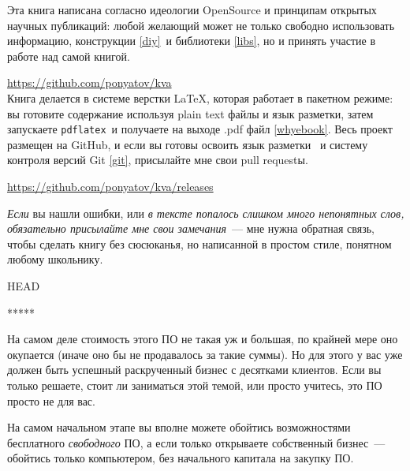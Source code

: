 

\bigskip

\noindent
Эта книга написана согласно идеологии OpenSource и принципам открытых научных
публикаций: любой желающий может не только свободно использовать информацию,
конструкции \ref{diy}\ и библиотеки \ref{libs}, но и принять участие в работе
над самой книгой. \licence


\bigskip
\url{https://github.com/ponyatov/kva}\\

\clearpage 
Книга делается в системе верстки \LaTeX{}, которая работает в пакетном
режиме:
вы готовите содержание используя plain text файлы и язык разметки, затем
запускаете \verb|pdflatex|\ и получаете на выходе .pdf файл \ref{whyebook}. Весь
проект размещен на GitHub, и если вы готовы освоить язык разметки
\cite{lvovsky}\ и систему контроля версий Git \ref{git}, присылайте мне свои
pull requestы.

\medskip 
\url{https://github.com/ponyatov/kva/releases}

\bigskip
\emph{Если} вы нашли ошибки, или \emph{в тексте попалось слишком много
непонятных слов, обязательно присылайте мне свои замечания}\ --- мне нужна
обратная связь, чтобы сделать книгу без сюсюканья, но написанной в простом
стиле, понятном любому школьнику.

HEAD


\clearpage

\label{whynd}
*****
\clearpage

На самом деле стоимость этого ПО не такая уж и большая, по крайней мере оно
окупается (иначе оно бы не продавалось за такие суммы). Но для этого у вас уже
должен быть успешный раскрученный бизнес с десятками клиентов. Если вы только
решаете, стоит ли заниматься этой темой, или просто учитесь, это ПО просто не
для вас.

На самом начальном этапе вы вполне можете обойтись возможностями
бесплатного \textit{свободного} ПО, а если только открываете собственный бизнес\
--- обойтись только компьютером, без начального капитала на закупку ПО.

